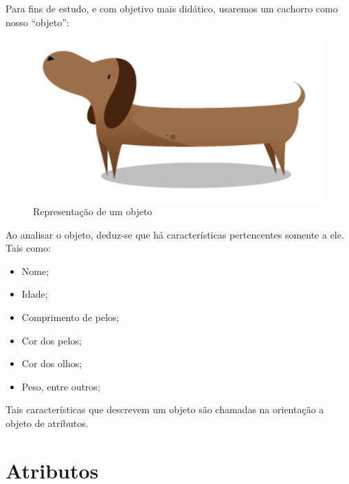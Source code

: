 Para fins de estudo, e com objetivo mais didático, usaremos um cachorro como 
nosso ``objeto'':

\begin{figure}[H]
  \centering
  \includegraphics[scale=0.4]{imagens/cachorro-objeto.png}
  \caption{Representação de um objeto}
  \label{fig:cachorro-objeto}
\end{figure}

Ao analisar o objeto, deduz-se que há características pertencentes somente a 
ele. Tais como:

\begin{itemize}
  \item Nome;
  \item Idade;
  \item Comprimento de pelos;
  \item Cor dos pelos;
  \item Cor dos olhos;
  \item Peso, entre outros;
\end{itemize}

Tais características que descrevem um objeto são chamadas na orientação a 
objeto de atributos.

%

\section{Atributos}

